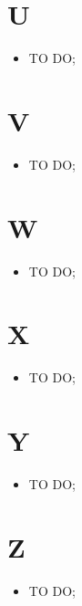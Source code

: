 %



\section*{U} %
\label{sec:u}
	\begin{itemize}
		\item TO DO;
	\end{itemize}

\section*{V} %
\label{sec:v}
	\begin{itemize}
		\item TO DO;
	\end{itemize}

\section*{W} %
\label{sec:w}
	\begin{itemize}
		\item TO DO;
	\end{itemize}

\section*{X} %
\label{sec:x}
	\begin{itemize}
		\item TO DO;
	\end{itemize}

\section*{Y} %
\label{sec:y}
	\begin{itemize}
		\item TO DO;
	\end{itemize}

\section*{Z} %
\label{sec:z}
	\begin{itemize}
		\item TO DO;
	\end{itemize}
